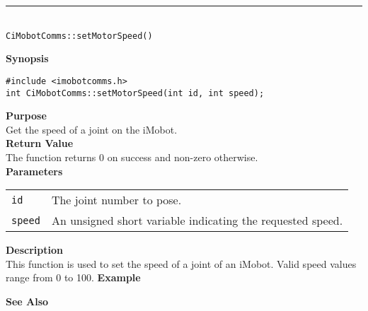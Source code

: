 \noindent
\vspace{5pt}
\rule{4.5in}{0.015in}\\
\noindent
{\LARGE \texttt{CiMobotComms::setMotorSpeed()}}\\
{}

\noindent
{\bf Synopsis}\\
\begin{verbatim}
#include <imobotcomms.h>
int CiMobotComms::setMotorSpeed(int id, int speed);
\end{verbatim}

\noindent
{\bf Purpose}\\
Get the speed of a joint on the iMobot.\\

\noindent
{\bf Return Value}\\
The function returns 0 on success and non-zero otherwise.\\

\noindent
{\bf Parameters}
\vspace{-0.1in}
\begin{description}
\item               
\begin{tabular}{p{10 mm}p{145 mm}}
\texttt{id} & The joint number to pose. \\
\texttt{speed} & An unsigned short variable indicating the requested speed.
\end{tabular}
\end{description}

\noindent
{\bf Description}\\
This function is used to set the speed of a joint of an iMobot. Valid speed
values range from 0 to 100.
\noindent
{\bf Example}\\
\noindent

\noindent
{\bf See Also}\\

